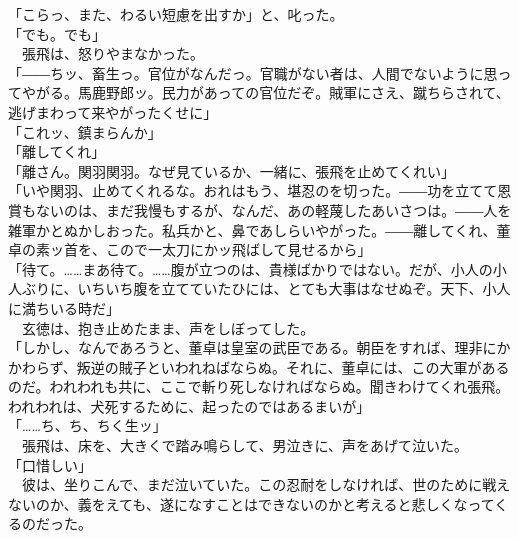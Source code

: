 \documentclass[
  paper=a5,
  fontsize=10pt,
  jafontsize=9.5pt,
  tate,                  %
  open_bracket_pos=nibu, %
]{jlreq}
\begin{document}
「こらっ、また、わるい短慮を出すか」と、叱った。\\


「でも。でも」\\


　張飛は、怒りやまなかった。\\


「――ちッ、畜生っ。官位がなんだっ。官職がない者は、人間でないように思ってやがる。馬鹿野郎ッ。民力があっての官位だぞ。賊軍にさえ、蹴ちらされて、逃げまわって来やがったくせに」\\


「これッ、鎮まらんか」\\


「離してくれ」\\


「離さん。関羽関羽。なぜ見ているか、一緒に、張飛を止めてくれい」\\


「いや関羽、止めてくれるな。おれはもう、堪忍のを切った。――功を立てて恩賞もないのは、まだ我慢もするが、なんだ、あの軽蔑したあいさつは。――人を雑軍かとぬかしおった。私兵かと、鼻であしらいやがった。――離してくれ、董卓の素ッ首を、こので一太刀にかッ飛ばして見せるから」\\


「待て。……まあ待て。……腹が立つのは、貴様ばかりではない。だが、小人の小人ぶりに、いちいち腹を立てていたひには、とても大事はなせぬぞ。天下、小人に満ちいる時だ」\\


　玄徳は、抱き止めたまま、声をしぼってした。\\


「しかし、なんであろうと、董卓は皇室の武臣である。朝臣をすれば、理非にかかわらず、叛逆の賊子といわれねばならぬ。それに、董卓には、この大軍があるのだ。われわれも共に、ここで斬り死しなければならぬ。聞きわけてくれ張飛。われわれは、犬死するために、起ったのではあるまいが」\\


「……ち、ち、ちく生ッ」\\


　張飛は、床を、大きくで踏み鳴らして、男泣きに、声をあげて泣いた。\\


「口惜しい」\\


　彼は、坐りこんで、まだ泣いていた。この忍耐をしなければ、世のために戦えないのか、義をえても、遂になすことはできないのかと考えると悲しくなってくるのだった。\\
\end{document}
